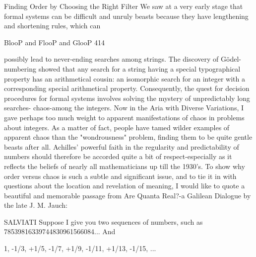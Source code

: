                    Finding Order by Choosing the Right Filter
We saw at a very early stage that formal systems can be difficult and unruly beasts
because they have lengthening and shortening rules, which can




BlooP and FlooP and GlooP                                                                     414

possibly lead to never-ending searches among strings. The discovery of Gödel-numbering
showed that any search for a string having a special typographical property has an
arithmetical cousin: an isomorphic search for an integer with a corresponding special
arithmetical property. Consequently, the quest for decision procedures for formal systems
involves solving the mystery of unpredictably long searches- chaos-among the integers.
Now in the Aria with Diverse Variations, I gave perhaps too much weight to apparent
manifestations of chaos in problems about integers. As a matter of fact, people have
tamed wilder examples of apparent chaos than the "wondrousness" problem, finding them
to be quite gentle beasts after all. Achilles' powerful faith in the regularity and
predictability of numbers should therefore be accorded quite a bit of respect-especially as
it reflects the beliefs of nearly all mathematicians up till the 1930's. To show why order
versus chaos is such a subtle and significant issue, and to tie it in with questions about the
location and revelation of meaning, I would like to quote a beautiful and memorable
passage from Are Quanta Real?-a Galilean Dialogue by the late J. M. Jauch:

        SALVIATI Suppose I give you two sequences of numbers, such as
             78539816339744830961566084...
  And

               1, -1/3, +1/5, -1/7, +1/9, -1/11, +1/13, -1/15, ...

